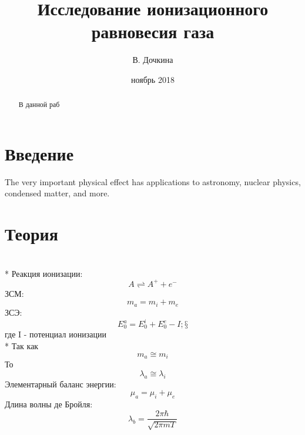 \documentclass[letterpaper,12pt]{article}
\begin{document}
\title{Исследование ионизационного равновесия газа}
\author{В. Дочкина}
\date{ноябрь 2018}
\maketitle

\begin{abstract}
В данной раб
\end{abstract}


\section{Введение}

The very important physical effect has applications to astronomy, nuclear physics, condensed matter, and more. 


\section{Теория}
\\* Реакция ионизации:
\begin{equation} \label{eq:aperp} %
A\rightleftharpoons A^{+}+e^{-}
\end{equation}
ЗСМ:
\begin{equation} \label{eq:aperp} %
m_{a}=m_{i}+m_{e}
\end{equation}
ЗСЭ:
\begin{equation} \label{eq:aperp} %
E_{0}^{a}=E_{0}^{i}+E_{0}^{e}-I ;§
\end{equation}
где I - потенциал ионизации
\\*
Так как
\begin{equation} \label{eq:aperp} %
m_{a}\cong m_{i}
\end{equation}
То
\begin{equation} \label{eq:aperp} %
\lambda_{a}\cong \lambda_{i}
\end{equation} 
Элементарный баланс энергии:
\begin{equation} \label{eq:aperp} %
\mu_{a}=\mu_{i}+\mu_{e}
\end{equation}
Длина волны де Бройля:
\begin{equation} \label{eq:aperp} %
\lambda_{b}= \frac{2\pi\hbar}{\sqrt{2\pi m T}}
\end{equation}
\end{document}
